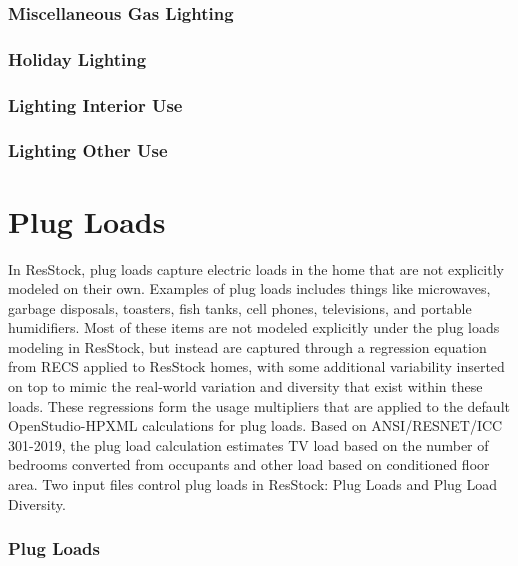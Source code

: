 \subsubsection{Miscellaneous Gas Lighting}\label{misc_gas_lighting}


\subsubsection{Holiday Lighting}\label{holiday_lighting}


\subsubsection{Lighting Interior Use}\label{lighting_interior_use}


\subsubsection{Lighting Other Use}\label{lighting_other_use}





\section{Plug Loads}
In ResStock, plug loads capture electric loads in the home that are not explicitly modeled on their own. Examples of plug loads includes things like microwaves, garbage disposals, toasters, fish tanks, cell phones, televisions, and portable humidifiers. Most of these items are not modeled explicitly under the plug loads modeling in ResStock, but instead are captured through a regression equation from RECS applied to ResStock homes, with some additional variability inserted on top to mimic the real-world variation and diversity that exist within these loads. These regressions form the usage multipliers that are applied to the default OpenStudio-HPXML calculations for plug loads. Based on ANSI/RESNET/ICC 301-2019, the plug load calculation estimates TV load based on the number of bedrooms converted from occupants and other load based on conditioned floor area. Two input files control plug loads in ResStock: Plug Loads and Plug Load Diversity.

\subsubsection{Plug Loads}\label{plug_loads}


